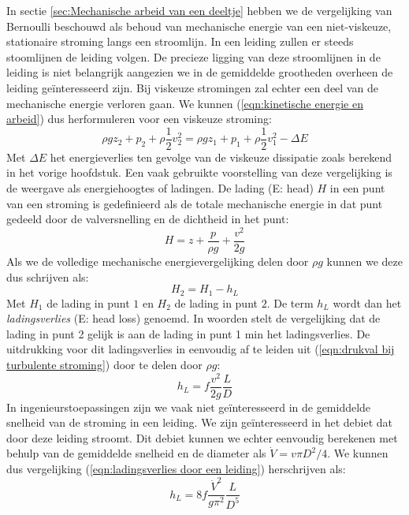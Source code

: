 In sectie \ref{sec:Mechanische arbeid van een deeltje} hebben we de vergelijking van Bernoulli beschouwd als behoud van mechanische energie van een niet-viskeuze, stationaire stroming langs een stroomlijn. In een leiding zullen er steeds stoomlijnen de leiding volgen. De precieze ligging van deze stroomlijnen in de leiding is niet belangrijk aangezien we in de gemiddelde grootheden overheen de leiding geïnteresseerd zijn. Bij viskeuze stromingen zal echter een deel van de mechanische energie verloren gaan. We kunnen (\ref{eqn:kinetische energie en arbeid}) dus herformuleren voor een viskeuze stroming:
\begin{equation}
	 \rho g z_2 + p_2 + \rho \frac{1}{2} v_2^2 =  \rho g z_1 + p_1 + \rho \frac{1}{2} v_1^2 - \Delta E
\end{equation}
Met $\Delta E$ het energieverlies ten gevolge van de viskeuze dissipatie zoals berekend in het vorige hoofdstuk. Een vaak gebruikte voorstelling van deze vergelijking is de weergave als energiehoogtes of ladingen. De lading (E: head) $H$ in een punt van een stroming is gedefinieerd als de totale mechanische energie in dat punt gedeeld door de valversnelling en de dichtheid in het punt:
\begin{equation}
	H = z + \frac{p}{\rho g} + \frac{v^2}{2 g}
\end{equation}
Als we de volledige mechanische energievergelijking delen door $\rho g$ kunnen we deze dus schrijven als:
\begin{equation}
	H_2 = H_1 - h_L
\end{equation}
Met $H_1$ de lading in punt $1$ en $H_2$ de lading in punt $2$.
De term $h_L$ wordt dan het \emph{ladingsverlies} (E: head loss) genoemd. In woorden stelt de vergelijking dat de lading in punt 2 gelijk is aan de lading in punt 1 min het ladingsverlies. De uitdrukking voor dit ladingsverlies in eenvoudig af te leiden uit (\ref{eqn:drukval bij turbulente stroming}) door te delen door $\rho g$:
\begin{equation}
	h_L = f \frac{v^2}{2 g} \frac{L}{D}
	\label{eqn:ladingsverlies door een leiding}
\end{equation}
In ingenieurstoepassingen zijn we vaak niet geïnteresseerd in de gemiddelde snelheid van de stroming in een leiding. We zijn geïnteresseerd in het debiet dat door deze leiding stroomt. Dit debiet kunnen we echter eenvoudig berekenen met behulp van de gemiddelde snelheid en de diameter als $\dot{V} = v \pi D^2/4$. We kunnen dus vergelijking (\ref{eqn:ladingsverlies door een leiding}) herschrijven als:
\begin{equation}
	h_L = 8 f \frac{\dot{V}^2}{g \pi^2} \frac{L}{D^5}
	\label{eqn:ladingsverlies door een leiding debiet}
\end{equation}

